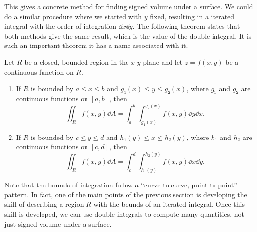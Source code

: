 This gives a concrete method for finding signed volume under a surface. We could do a similar procedure where we started with $y$ fixed, resulting in a iterated integral with the order of integration $\dd x\dd y$. The following theorem states that both methods give the same result, which is the value of the double integral. It is such an important theorem it has a name associated with it.

\begin{theorem}\label{thm:fubini}
Let $R$ be a closed, bounded region in the $x$-$y$ plane and let $z=f(x,y)$ be a continuous function on $R$.%
\begin{enumerate}
	\item If $R$ is bounded by $a\leq x\leq b$ and $g_1(x)\leq y\leq g_2(x)$, where $g_1$ and $g_2$ are continuous functions on $[a,b]$, then
	\[\iint_R f(x,y)\dd A = \int_a^b\int_{g_1(x)}^{g_2(x)} f(x,y)\dd y\dd x.\]
	
	\item If $R$ is bounded by $c\leq y\leq d$ and $h_1(y)\leq x\leq h_2(y)$, where $h_1$ and $h_2$ are continuous functions on $[c,d]$, then
	\[\iint_R f(x,y)\dd A = \int_c^d\int_{h_1(y)}^{h_2(y)} f(x,y)\dd x\dd y.\]
\end{enumerate}
\end{theorem}

Note that the bounds of integration follow a ``curve to curve, point to point'' pattern. In fact, one of the main points of the previous section is developing the skill of describing a region $R$ with the bounds of an iterated integral. Once this skill is developed, we can use double integrals to compute many quantities, not just signed volume under a surface.


